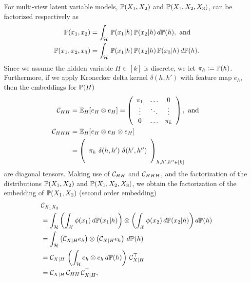 \documentclass{article}
\begin{document}
For multi-view latent variable models, $\mathbb{P}(X_1,X_2)$ and $\mathbb{P}(X_1,X_2,X_3)$, can be factorized respectively as
\begin{align*}
	\mathbb{P}(x_1, x_2) &= \int_{\mathcal{H}}\, \mathbb{P}(x_1 | h )\, \mathbb{P}(x_2 | h)\, d\mathbb{P}(h),~\text{and}\\
	\mathbb{P}(x_1, x_2, x_3) &= \int_{\mathcal{H}}\, \mathbb{P}(x_1 | h )\, \mathbb{P}(x_2 | h)\, \mathbb{P}(x_3 | h)\, d\mathbb{P}(h).
\end{align*}
Since we assume the hidden variable $H \in [k]$ is discrete,
we let $\pi_h:=\mathbb{P}(h)$. Furthermore, if we apply Kronecker delta kernel $\delta(h,h')$ with feature map $e_h$, then the embeddings for $\mathbb{P}(H)$
\begin{align*}
 \mathcal{C}_{HH} &= \mathbb{E}_H[e_H \otimes e_H] = \left(
  \begin{array}{ccc}
    \pi_1& \ldots & 0 \cr
    \vdots & \ddots & \vdots \cr
    0 & \ldots & \pi_k
  \end{array}
 \right),
 ~\text{and}~\\
 \mathcal{C}_{HHH} &= \mathbb{E}_H[e_H \otimes e_H \otimes e_H]  \\
	&= \left(
  \begin{array}{c}
    \cr
    \pi_h\ \delta(h,h')\ \delta(h',h'') \cr
    \cr
  \end{array}
 \right)_{h,h',h''\in[k]}
\end{align*}
are diagonal tensors. Making use of $\mathcal{C}_{HH}$ and $\mathcal{C}_{HHH}$, and the factorization of the distributions $\mathbb{P}(X_1,X_2)$ and $\mathbb{P}(X_1,X_2,X_3)$, we obtain the factorization of the embedding of
$\mathbb{P}(X_1,X_2)$ (second order embedding)
\begin{align}
  &\mathcal{C}_{X_1X_2} \nonumber \\
  &= \int_{\mathcal{H}} \left(\int_{\mathcal{X}} \phi(x_1)\, d\mathbb{P}(x_1|h)\right) \otimes \left(\int_{\mathcal{X}} \phi(x_2)\, d\mathbb{P}(x_2 |h)\right) d\mathbb{P}(h) \nonumber \\
  &= \int_{\mathcal{H}} \left(\mathcal{C}_{X|H} e_h\right) \otimes \left(\mathcal{C}_{X|H} e_h\right)\, d\mathbb{P}(h) \nonumber \\
  &= \mathcal{C}_{X|H}\, \left(\int_{\mathcal{H}} e_h \otimes e_h\, d\mathbb{P}(h)\right)\, \mathcal{C}_{X|H}^\top \nonumber \\
  &= \mathcal{C}_{X|H}\, \mathcal{C}_{HH}\, \mathcal{C}_{X|H}^\top, \label{eq:pair_factorization}
\end{align}
\end{document}
